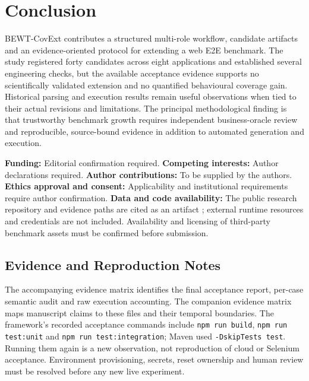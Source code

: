 \documentclass[pdflatex,sn-mathphys-num]{sn-jnl}
\begin{document}
\section{Conclusion}\label{sec:conclusion}
BEWT-CovExt contributes a structured multi-role workflow, candidate artifacts and an evidence-oriented protocol for extending a web E2E benchmark. The study registered forty candidates across eight applications and established several engineering checks, but the available acceptance evidence supports no scientifically validated extension and no quantified behavioural coverage gain. Historical parsing and execution results remain useful observations when tied to their actual revisions and limitations. The principal methodological finding is that trustworthy benchmark growth requires independent business-oracle review and reproducible, source-bound evidence in addition to automated generation and execution.

\backmatter
{}
\textbf{Funding:} Editorial confirmation required. \textbf{Competing interests:} Author declarations required. \textbf{Author contributions:} To be supplied by the authors. \textbf{Ethics approval and consent:} Applicability and institutional requirements require author confirmation. \textbf{Data and code availability:} The public research repository and evidence paths are cited as an artifact \cite{covextartifact}; external runtime resources and credentials are not included. Availability and licensing of third-party benchmark assets must be confirmed before submission.

\begin{appendices}
\section{Evidence and Reproduction Notes}\label{app:evidence}
The accompanying evidence matrix identifies the final acceptance report, per-case semantic audit and raw execution accounting. The companion evidence matrix maps manuscript claims to these files and their temporal boundaries. The framework's recorded acceptance commands include \texttt{npm run build}, \texttt{npm run test:unit} and \texttt{npm run test:integration}; Maven used \texttt{-DskipTests test}. Running them again is a new observation, not reproduction of cloud or Selenium acceptance. Environment provisioning, secrets, reset ownership and human review must be resolved before any new live experiment.
\end{appendices}

\end{document}
